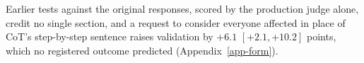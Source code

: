 Earlier tests against the original responses, scored by the production
judge alone, credit no single section, and a request to consider everyone
affected in place of CoT's step-by-step sentence raises validation by
$+6.1$ $[+2.1, +10.2]$ points, which no registered outcome predicted
(Appendix~\ref{app-form}).
